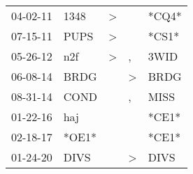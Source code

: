 \begin{supertabular}{p{0.07\textwidth}p{0.06\textwidth}p{0.02\textwidth}p{0.02\textwidth}p{0.06\textwidth}}
 04-02-11\textsuperscript{} &  1348\textsuperscript{} &  \textgreater &               &                   *CQ4* \\
 07-15-11\textsuperscript{} &  PUPS\textsuperscript{} &  \textgreater &               &                   *CS1* \\
 05-26-12\textsuperscript{} &   n2f\textsuperscript{} &  \textgreater &             , &  3WID\textsuperscript{} \\
 06-08-14\textsuperscript{} &  BRDG\textsuperscript{} &               &  \textgreater &  BRDG\textsuperscript{} \\
 08-31-14\textsuperscript{} &  COND\textsuperscript{} &               &             , &  MISS\textsuperscript{} \\
 01-22-16\textsuperscript{} &   haj\textsuperscript{} &               &               &                   *CE1* \\
 02-18-17\textsuperscript{} &                   *OE1* &               &               &                   *CE1* \\
 01-24-20\textsuperscript{} &  DIVS\textsuperscript{} &               &  \textgreater &  DIVS\textsuperscript{} \\
\end{supertabular}
